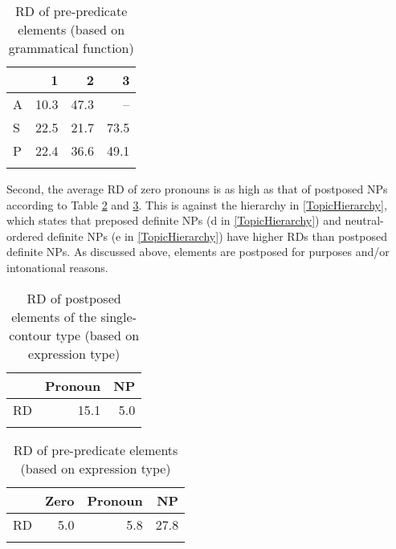 \begin{table}
\centering
\caption{RD of pre-predicate elements (based on grammatical function)}
\label{RDASP}
\begin{tabular}{lrrr}
\lsptoprule
		& 1	& 2	& 3 \\
\midrule
	A	& 10.3	& 47.3	& -- \\
	S	& 22.5	& 21.7	& 73.5 \\
	P	& 22.4	& 36.6	& 49.1 \\
\lspbottomrule
\end{tabular}
\end{table}

Second,
the average RD of zero pronouns is as high as that of postposed NPs
according to Table \ref{RDPostExpTypeT} and \ref{RDPreExpTypeT}.
This is against the  hierarchy in \ref{TopicHierarchy}, which states that
preposed definite NPs (d in \ref{TopicHierarchy}) and neutral-ordered definite NPs (e in \ref{TopicHierarchy}) have
higher RDs than
postposed definite NPs.
As discussed above,
elements are postposed for  purposes and/or intonational reasons.


\begin{table}
\centering
\caption{RD of postposed elements of the single-contour type (based on expression type)}
\begin{tabular}{lrr}
\lsptoprule
  & Pronoun & NP \\
\midrule
RD & 15.1 & 5.0 \\
\lspbottomrule
\end{tabular}
\label{RDPostExpTypeT}
\end{table}
\begin{table}
\centering
\caption{RD of pre-predicate elements (based on expression type)}
\begin{tabular}{lrrr}
\lsptoprule
     & Zero & Pronoun & NP \\
\midrule
 RD  & 5.0  & 5.8     & 27.8 \\
\lspbottomrule
\end{tabular}
\label{RDPreExpTypeT}
\end{table}

